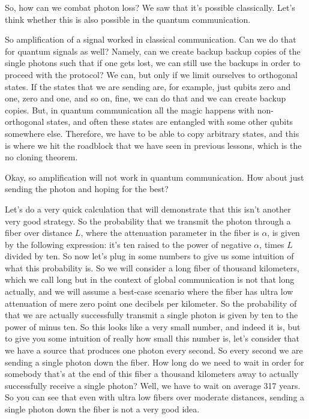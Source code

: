 So, how can we combat photon loss? We saw that it's possible classically. Let's think whether this is also possible in the quantum communication.

So amplification of a signal worked in classical communication. Can we do that for quantum signals as well? Namely, can we create backup backup copies of the single photons such that if one gets lost, we can still use the backups in order to proceed with the protocol? We can, but only if we limit ourselves to orthogonal states. If the states that we are sending are, for example, just qubits zero and one, zero and one, and so on, fine, we can do that and we can create backup copies. But, in quantum communication all the magic happens with non-orthogonal states, and often these states are entangled with some other qubits somewhere else. Therefore, we have to be able to copy arbitrary states, and this is where we hit the roadblock that we have seen in previous lessons, which is the no cloning theorem.

Okay, so amplification will not work in quantum communication. How about just sending the photon and hoping for the best?

Let's do a very quick calculation that will demonstrate that this isn't another very good strategy. So the probability that we transmit the photon through a fiber over distance $L$, where the attenuation parameter in the fiber is $\alpha$, is given by the following expression: it's ten raised to the power of negative $\alpha$, times $L$ divided by ten. So now let's plug in some numbers to give us some intuition of what this probability is. So we will consider a long fiber of thousand kilometers, which we call long but in the context of global communication is not that long actually, and we will assume a best-case scenario where the fiber has ultra low attenuation of mere zero point one decibels per kilometer. So the probability of that we are actually successfully transmit a single photon is given by ten to the power of minus ten. So this looks like a very small number, and indeed it is, but to give you some intuition of really how small this number is, let's consider that we have a source that produces one photon every second. So every second we are sending a single photon down the fiber. How long do we need to wait in order for somebody that's at the end of this fiber a thousand kilometers away to actually successfully receive a single photon? Well, we have to wait on average 317 years. So you can see that even with ultra low fibers over moderate distances, sending a single photon down the fiber is not a very good idea.

